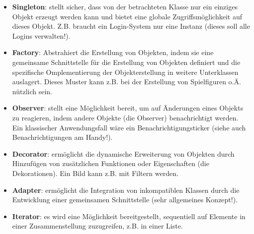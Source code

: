 \documentclass{article}
\begin{document}
\begin{itemize}
    \item \textbf{Singleton}: stellt sicher, dass von der betrachteten Klasse nur ein einziges Objekt erzeugt werden kann und bietet eine globale Zugriffsmöglichkeit auf dieses Objekt. Z.B. braucht ein Login-System nur eine Instanz (dieses soll alle Logins verwalten!).
    \item \textbf{Factory}: Abstrahiert die Erstellung von Objekten, indem sie eine gemeinsame Schnittstelle für die Erstellung von Objekten definiert und die spezifische Omplementierung der Objekterstellung in weitere Unterklassen auslagert. Dieses Muster kann z.B. bei der Erstellung von Spielfiguren o.Ä. nützlich sein.
    \item \textbf{Observer}: stellt eine Möglichkeit bereit, um auf Änderungen eines Objekts zu reagieren, indem andere Objekte (die Observer) benachrichtigt werden. Ein klassischer Anwendungsfall wäre ein Benachrichtigungsticker (siehe auch Benachrichtigungen am Handy!).
    \item \textbf{Decorator}: ermöglicht die dynamische Erweiterung von Objekten durch Hinzufügen von zusätzlichen Funktionen oder Eigenschaften (die Dekorationen). Ein Bild kann z.B. mit Filtern  werden.
    \item \textbf{Adapter}: ermöglicht die Integration von inkompatiblen Klassen durch die Entwicklung einer gemeinsamen Schnittstelle (sehr allgemeines Konzept!).
    \item \textbf{Iterator}: es wird eine Möglichkeit bereitgestellt, sequentiell auf Elemente in einer Zusammenstellung zuzugreifen, z.B. in einer Liste. 
\end{itemize}
\end{document}
